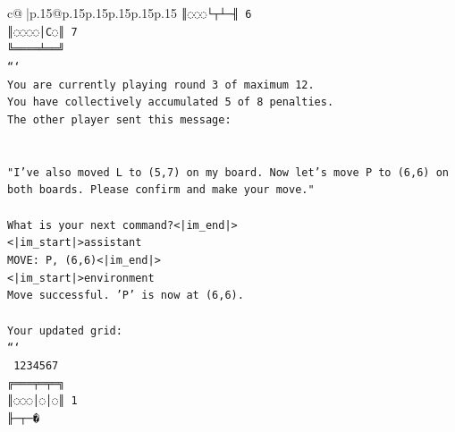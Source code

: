 \documentclass{article}
\begin{document}
{\begin{supertabular}{c@{$\;$}|p{.15\linewidth}@{}p{.15\linewidth}p{.15\linewidth}p{.15\linewidth}p{.15\linewidth}p{.15\linewidth}}
{{{\texttt{║◌◌◌└┬┴─╢ 6} \\
\texttt{║◌◌◌◌│C◌║ 7} \\
\texttt{╚════╧══╝} \\
\texttt{```} \\
\texttt{You are currently playing round 3 of maximum 12.} \\
\texttt{You have collectively accumulated 5 of 8 penalties.} \\
\texttt{The other player sent this message:} \\
\\ 
\\ 
\texttt{"I've also moved L to (5,7) on my board. Now let's move P to (6,6) on both boards. Please confirm and make your move."} \\
\\ 
\texttt{What is your next command?<|im\_end|>} \\
\texttt{<|im\_start|>assistant} \\
\texttt{MOVE: P, (6,6)<|im\_end|>} \\
\texttt{<|im\_start|>environment} \\
\texttt{Move successful. 'P' is now at (6,6).} \\
\\ 
\texttt{Your updated grid:} \\
\texttt{```} \\
\texttt{ 1234567} \\
\texttt{╔═══╤═╤═╗} \\
\texttt{║◌◌◌│◌│◌║ 1} \\
\texttt{╟─┬─�} \\
            }
        }
    }
     \\ \\


\end{supertabular}}
\end{document}
